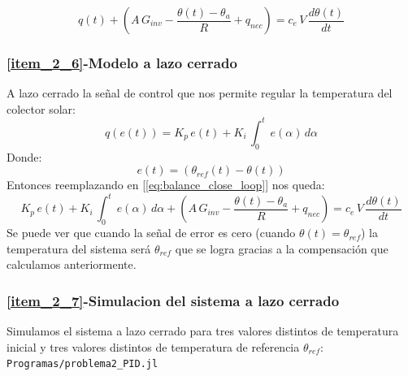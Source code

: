 \begin{equation}
   q(t)+ \left(A\,G_{inv}-\dfrac{\theta(t)-\theta_{a}}{R} + q_{nec}\right)=c_e\,V\,\dfrac{d\theta(t)}{dt}
   \label{eq:balance_close_loop}
\end{equation}

\subsubsection{\ref{item_2_6}-Modelo a lazo cerrado}
A lazo cerrado la señal de control que nos permite regular la temperatura del colector solar:
\begin{equation}
   q(e(t))=K_p\,e(t)+K_i\,\int_0^{t}\,e(\alpha)\,d\alpha
\end{equation}
Donde:
\begin{equation}
   e(t) = (\theta_{ref}(t)-\theta(t))
\end{equation}
Entonces reemplazando en [\ref{eq:balance_close_loop}] nos queda:
\begin{equation}
   K_p\,e(t)+K_i\,\int_0^{t}\,e(\alpha)\,d\alpha + \left(A\,G_{inv}-\dfrac{\theta(t)-\theta_{a}}{R} + q_{nec}\right)=
   c_e\,V\,\dfrac{d\theta(t)}{dt}
   \label{eq:close_loop}
\end{equation}
Se puede ver que cuando la señal de error es cero (cuando $\theta(t)=\theta_{ref}$) la temperatura del sistema será
$\theta_{ref}$ que se logra gracias a la compensación que calculamos anteriormente.
\subsubsection{\ref{item_2_7}-Simulacion del sistema a lazo cerrado}

Simulamos el sistema a lazo cerrado para tres valores distintos de temperatura inicial y tres valores distintos de temperatura
de referencia $\theta_{ref}$:
\verb|Programas/problema2_PID.jl|

